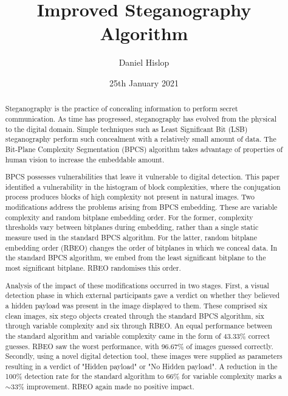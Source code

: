 \documentclass{l4proj}
\begin{document}
\title{Improved Steganography Algorithm}
\author{Daniel Hislop}
\date{25th January 2021}

\maketitle

\begin{abstract}
    Steganography is the practice of concealing information to perform secret communication. As time has progressed, steganography has evolved from the physical to the digital domain. Simple techniques such as Least Significant Bit (LSB) steganography perform such concealment with a relatively small amount of data. The Bit-Plane Complexity Segmentation (BPCS) algorithm takes advantage of properties of human vision to increase the embeddable amount. 

    BPCS possesses vulnerabilities that leave it vulnerable to digital detection. This paper identified a vulnerability in the histogram of block complexities, where the conjugation process produces blocks of high complexity not present in natural images. Two modifications address the problems arising from BPCS embedding. These are variable complexity and random bitplane embedding order. For the former, complexity thresholds vary between bitplanes during embedding, rather than a single static measure used in the standard BPCS algorithm. For the latter, random bitplane embedding order (RBEO) changes the order of bitplanes in which we conceal data. In the standard BPCS algorithm, we embed from the least significant bitplane to the most significant bitplane. RBEO randomises this order. 
    
    Analysis of the impact of these modifications occurred in two stages. First, a visual detection phase in which external participants gave a verdict on whether they believed a hidden payload was present in the image displayed to them. These comprised six clean images, six stego objects created through the standard BPCS algorithm, six through variable complexity and six through RBEO. An equal performance between the standard algorithm and variable complexity came in the form of 43.33\% correct guesses. RBEO saw the worst performance, with 96.67\% of images guessed correctly. Secondly, using a novel digital detection tool, these images were supplied as parameters resulting in a verdict of "Hidden payload" or "No Hidden payload". A reduction in the 100\% detection rate for the standard algorithm to 66\% for variable complexity marks a $\sim$33\% improvement. RBEO again made no positive impact.
    

\end{abstract}
\end{document}
